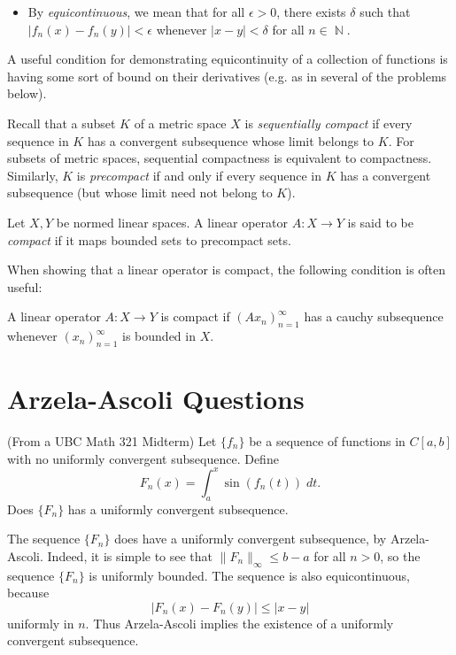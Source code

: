 \documentclass[answers]{exam}
\DeclareMathOperator{\NN}{\mathbb{N}}
\begin{document}
\begin{questions}
\begin{itemize}
\item By \textit{equicontinuous}, we mean that for all $\epsilon>0$, there exists $\delta$ such that  $|f_n(x)-f_n(y)|<\epsilon$ whenever $|x-y|<\delta$ for all $n\in \NN$.

\end{itemize}

A useful condition for demonstrating equicontinuity of a collection of functions is having some sort of bound on their derivatives (e.g. as in several of the problems below).


Recall that a subset $K$ of a metric space $X$ is \textit{sequentially compact} if every sequence in $K$ has a convergent subsequence whose limit belongs to $K$. For subsets of metric spaces, sequential compactness is equivalent to compactness. Similarly, $K$ is \textit{precompact} if and only if every sequence in $K$ has a convergent subsequence (but whose limit need not belong to $K$).


Let $X,Y$ be normed linear spaces. A linear operator $A:X\to Y$ is said to be \textit{compact} if it maps bounded sets to precompact sets.

When showing that a linear operator is compact, the following condition is often useful: 

A linear operator $A:X\to Y$ is compact if $(Ax_n)_{n=1}^{\infty}$ has a cauchy subsequence whenever $(x_n)_{n=1}^{\infty}$ is bounded in $X$.


\newpage
\section{Arzela-Ascoli Questions}

\question (From a UBC Math 321 Midterm) Let $\{ f_n \}$ be a sequence of functions in $C[a,b]$ with no uniformly convergent subsequence. Define
%
\[ F_n(x) = \int_a^x \sin(f_n(t))\; dt. \]
%
Does $\{ F_n \}$ has a uniformly convergent subsequence.
\begin{solution}
    The sequence $\{ F_n \}$ does have a uniformly convergent subsequence, by Arzela-Ascoli. Indeed, it is simple to see that $\| F_n \|_\infty \leq b - a$ for all $n > 0$, so the sequence $\{ F_n \}$ is uniformly bounded. The sequence is also equicontinuous, because
    \[ |F_n(x) - F_n(y)| \leq |x - y| \]
    uniformly in $n$. Thus Arzela-Ascoli implies the existence of a uniformly convergent subsequence.
\end{solution}



\end{questions}
\end{document}
